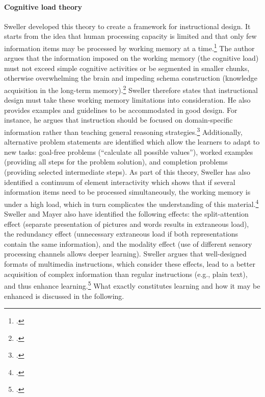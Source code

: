 \paragraph{Cognitive load theory} Sweller developed this theory to create a framework for instructional design. It starts from the idea that human processing capacity is limited and that only few information items may be processed by working memory at a time.\footcites[Cf.][p.250]{SwellerCognitiveArchitectureInstructional1998}[cf.][p.490]{Gervenefficiencymultimedialearning2003} The author argues that the information imposed on the working memory (the cognitive load) must not exceed simple cognitive activities or be segmented in smaller chunks, otherwise overwhelming the brain and impeding schema construction (knowledge acquisition in the long-term memory).\footcites[Cf.][p.255 et seqq]{SwellerCognitiveArchitectureInstructional1998}[cf.][p.2]{SwellerVisualisationInstructionalDesign2002}[cf.][p.562]{Gervenefficiencymultimedialearning2003} Sweller therefore states that instructional design must take these working memory limitations into consideration. He also provides examples and guidelines to be accommodated in good design. For instance, he argues that instruction should be focused on domain-specific information rather than teaching general reasoning strategies.\footcites[Cf.][p.255]{SwellerCognitiveArchitectureInstructional1998}[cf.][p.301]{SwellerCognitiveloadtheory1994} Additionally, alternative problem statements are identified which allow the learners to adapt to new tasks: goal-free problems (\enquote{calculate all possible values}), worked examples (providing all steps for the problem solution), and completion problems (providing selected intermediate steps).
As part of this theory, Sweller has also identified a continuum of element interactivity which shows that if several information items need to be processed simultaneously, the working memory is under a high load, which in turn complicates the understanding of this material.\footcites[Cf.][p.261]{SwellerCognitiveArchitectureInstructional1998} Sweller and Mayer also have identified the following effects: the split-attention effect (separate presentation of pictures and words results in extraneous load), the redundancy effect (unnecessary extraneous load if both representations contain the same information), and the modality effect (use of different sensory processing channels allows deeper learning). Sweller argues that well-designed formats of multimedia instructions, which consider these effects, lead to a better acquisition of complex information than regular instructions (e.g., plain text), and thus enhance learning.\footcites[Cf.][p.4]{PaasCognitiveLoadTheory2004} What exactly constitutes learning and how it may be enhanced is discussed in the following.

